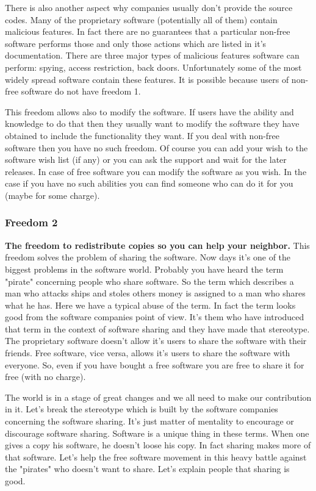 There is also another aspect why companies usually don't provide the source codes. Many of the proprietary software (potentially all of them) contain malicious features. In fact there are no guarantees that a particular non-free software performs those and only those actions which are listed in it's documentation. There are three major types of malicious features software can perform: spying, access restriction, back doors. Unfortunately some of the most widely spread software contain these features. It is possible because users of non-free software do not have freedom 1. 

This freedom allows also to modify the software. If users have the ability and knowledge to do that then they usually want to modify the software they have obtained to include the functionality they want. If you deal with non-free software then you have no such freedom. Of course you can add your wish to the software wish list (if any) or you can ask the support and wait for the later releases. In case of free software you can modify the software as you wish. In the case if you have no such abilities you can find someone who can do it for you (maybe for some charge).

\subsubsection{Freedom 2}
\textbf{The freedom to redistribute copies so you can help your neighbor.} This freedom solves the problem of sharing the software. Now days it's one of the biggest problems in the software world. Probably you have heard the term "pirate" concerning people who share software. So the term which describes a man who attacks ships and stoles others money is assigned to a man who shares what he has. Here we have a typical abuse of the term. In fact the term looks good from the software companies point of view. It's them who have introduced that term in the context of software sharing and they have made that stereotype. The proprietary software doesn't allow it's users to share the software with their friends. Free software, vice versa, allows it's users to share the software with everyone. So, even if you have bought a free software you are free to share it for free (with no charge). 

The world is in a stage of great changes and we all need to make our contribution in it. Let's break the stereotype which is built by the software companies concerning the software sharing. It's just matter of mentality to encourage or discourage software sharing. Software is a unique thing in these terms. When one gives a copy his software, he doesn't loose his copy. In fact sharing makes more of that software. Let's help the free software movement in this heavy battle against the "pirates" who doesn't want to share. Let's explain people that sharing is good.

